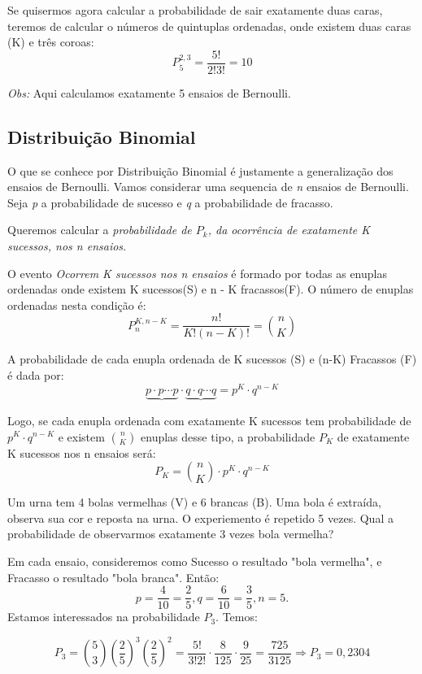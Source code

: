 \documentclass[10pt,a4paper]{article}
\begin{document}
Se quisermos agora calcular a probabilidade de sair exatamente duas caras, teremos de calcular o números de quintuplas ordenadas, onde existem duas caras (K) e três coroas:
\[P^{2,3}_{5} = \frac{5!}{2!3!} = 10\]

\textit{Obs:} Aqui calculamos exatamente 5 ensaios de Bernoulli.

\subsection{Distribuição Binomial}


O que se conhece por Distribuição Binomial é justamente a generalização dos ensaios de Bernoulli. Vamos considerar uma sequencia de \textit{n} ensaios de Bernoulli. Seja \textit{p} a probabilidade de sucesso e \textit{q} a probabilidade de fracasso.

 Queremos calcular a \emph{probabilidade de $P_{k}$, da ocorrência de exatamente K sucessos, nos n ensaios.}

O evento \textit{Ocorrem K sucessos nos n ensaios} é formado por todas as enuplas ordenadas onde existem K sucessos(S) e n - K fracassos(F). O número de enuplas ordenadas nesta condição é:
\[
	P^{K, n-K}_{n} = \frac{n!}{K!(n-K)!} = \binom{n}{K}
\]

A probabilidade de cada enupla ordenada de K sucessos (S) e (n-K) Fracassos (F) é dada por:
\[
	\underbrace{p \cdot p \cdots p} \cdot \underbrace{q \cdot q \cdots q} = p^{K}\cdot q^{n-K}
\]

Logo, se cada enupla ordenada com exatamente K sucessos tem probabilidade de $p^{K} \cdot q^{n-K}$ e existem $\binom{n}{K}$ enuplas desse tipo, a probabilidade $P_{K}$ de exatamente K sucessos nos n ensaios será:
\[
	P_{K} = \binom{n}{K} \cdot p^{K} \cdot q^{n-K}
\]

\begin{eg}
	Um urna tem 4 bolas vermelhas (V) e 6 brancas (B). Uma bola é extraída, observa sua cor e reposta na urna. O experiemento é repetido 5 vezes. Qual a probabilidade de observarmos exatamente 3 vezes bola vermelha?


Em cada ensaio, consideremos como Sucesso o resultado "bola vermelha", e Fracasso o resultado "bola branca". Então:
	\[
		p = \frac{4}{10} = \frac{2}{5}, q = \frac{6}{10} = \frac{3}{5}, n = 5.	
	\]
	Estamos interessados na probabilidade $P_{3}$. Temos:
	
	\[
		P_{3} = \binom{5}{3}(\frac{2}{5})^{3} (\frac{2}{5})^{2} = \frac{5!}{3!2!} \cdot \frac{8}{125} \cdot \frac{9}{25} = \frac{725}{3125} \Rightarrow
		P_{3} = 0,2304
	\]
\end{eg}
\end{document}
